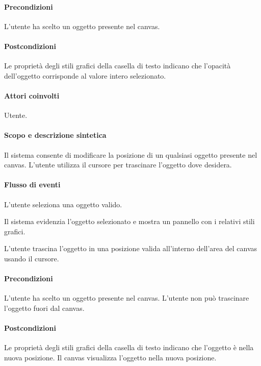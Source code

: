 \paragraph{Precondizioni} L'utente ha scelto un oggetto presente nel canvas.
\paragraph{Postcondizioni} Le propriet\` a degli stili grafici della casella di testo indicano che l'opacit\` a dell'oggetto corrisponde al valore intero selezionato.

\paragraph{Attori coinvolti} Utente.
\paragraph{Scopo e descrizione sintetica} Il sistema consente di modificare la posizione di un qualsiasi oggetto presente nel canvas. L'utente utilizza il cursore per trascinare l'oggetto dove desidera.
\paragraph{Flusso di eventi}
\begin{elenconumerato}[\textbf{}]{\subsubsecindent}
\item L'utente seleziona una oggetto valido.
\item Il sistema evidenzia l'oggetto selezionato e mostra un pannello con i relativi stili grafici.
\item L'utente trascina l'oggetto in una posizione valida all'interno dell'area del canvas usando il cursore.
\end{elenconumerato}
\paragraph{Precondizioni} L'utente ha scelto un oggetto presente nel canvas. L'utente non pu\` o trascinare l'oggetto fuori dal canvas.
\paragraph{Postcondizioni} Le propriet\` a degli stili grafici della casella di testo indicano che l'oggetto \` e nella nuova posizione. Il canvas visualizza l'oggetto nella nuova posizione.
 

